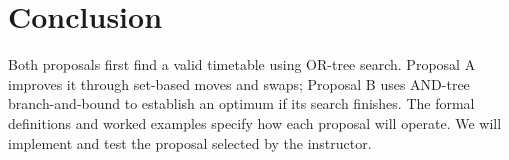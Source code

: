 \section{Conclusion}
\label{sec:conclusion}

Both proposals first find a valid timetable using OR-tree
search. Proposal A improves it through set-based moves and
swaps; Proposal B uses AND-tree branch-and-bound to establish
an optimum if its search finishes. The formal definitions
and worked examples specify how each proposal will operate.
We will implement and test the proposal selected by the
instructor.